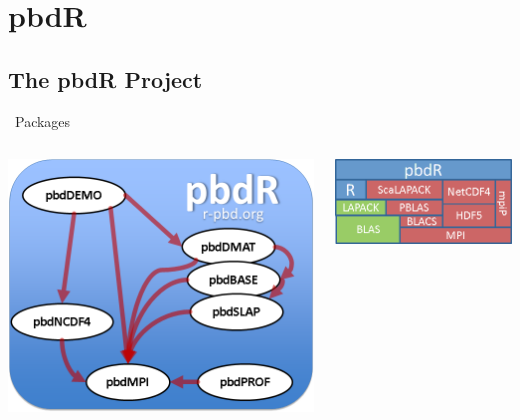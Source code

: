 \section{pbdR}
\makesubcontentsslides

\subsection{The pbdR Project}

\begin{frame}
  \begin{block}{\pbdR\ Packages}
    \begin{center}
      \begin{columns}\hspace{.2cm}
        \begin{column}{.52\textwidth}
          \includegraphics[scale=.4]{../common/pics/pbdR}
        \end{column}
        \hspace{.05cm}
        \begin{column}{.4\textwidth}
          \includegraphics[scale=.45]{../common/pics/libs}
        \end{column}
      \end{columns}
    \end{center}
  \end{block}
\end{frame}

